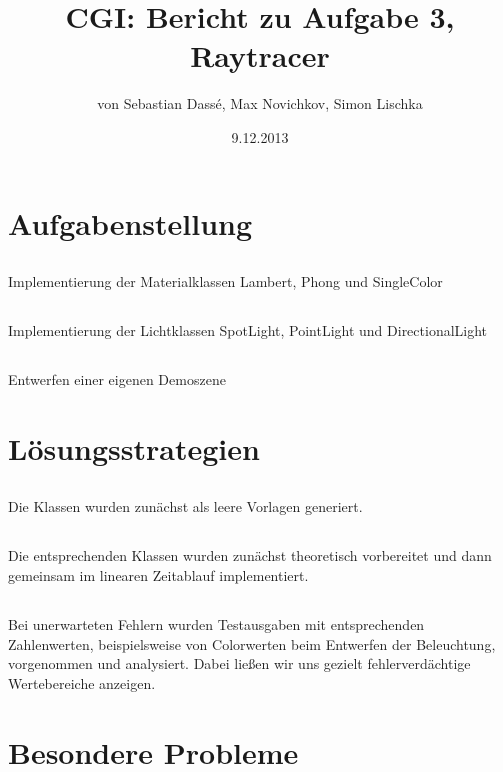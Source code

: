 \documentclass[11pt]{amsart}
\title{CGI: Bericht zu Aufgabe 3, Raytracer}
\author{von Sebastian Dass\'{e}, Max Novichkov, Simon Lischka }
\date{9.12.2013}
\begin{document}
\maketitle

\section{Aufgabenstellung}
\subsection{}
Implementierung der Materialklassen Lambert, Phong und SingleColor

\subsection{}
Implementierung der Lichtklassen SpotLight, PointLight und DirectionalLight

\subsection{}
Entwerfen einer eigenen Demoszene


\section{L\"osungsstrategien}
\subsection{}
Die Klassen wurden zun\"achst als leere Vorlagen generiert.

\subsection{}
Die entsprechenden Klassen wurden zun\"achst theoretisch vorbereitet und dann gemeinsam im linearen Zeitablauf implementiert.

\subsection{}
Bei unerwarteten Fehlern wurden Testausgaben mit entsprechenden Zahlenwerten, beispielsweise
von Colorwerten beim Entwerfen der Beleuchtung, vorgenommen und analysiert. Dabei lie\ss{}en wir 
uns gezielt fehlerverd\"achtige Wertebereiche anzeigen.



\section{Besondere Probleme}
\end{document}
